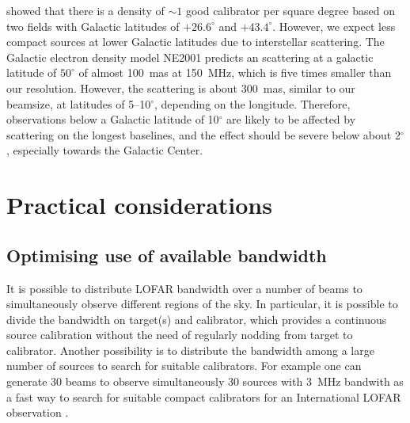 \documentclass[graybox]{svmult}
\begin{document}
\cite{moldon15} showed that there is a density of $\sim1$ good calibrator per
square degree based on two fields with Galactic latitudes of $+26.6^{\circ}$
and $+43.4^{\circ} $. However, we expect less compact sources at lower Galactic
latitudes due to interstellar scattering. The Galactic electron density model
NE2001 \citep{cordes02} predicts an scattering at a galactic latitude of
$50^{\circ}$ of almost 100~mas at 150~MHz, which is five times smaller than our
resolution. However, the scattering is about 300~mas, similar to our beamsize,
at latitudes of 5--10$^{\circ}$, depending on the longitude. Therefore,
observations below a Galactic latitude of 10$^{\circ}$ are likely to be
affected by scattering on the longest baselines, and the effect should be
severe below about 2$^{\circ}$, especially towards the Galactic Center. 


\section{Practical considerations}
\label{sec:practical}


\subsection{Optimising use of available bandwidth}\label{sec:bandwidth}
It is possible to distribute LOFAR bandwidth over a number of beams to
simultaneously observe different regions of the sky. In particular, it is
possible to divide the bandwidth on target(s) and calibrator, which provides a
continuous source calibration without the need of regularly nodding from target
to calibrator. Another possibility is to distribute the bandwidth among a large
number of sources to search for suitable calibrators. For example one can
generate 30 beams to observe simultaneously 30 sources with 3~MHz bandwith as a
fast way to search for suitable compact calibrators for an
International LOFAR observation \citep[see i.e.][]{moldon15}. 
\end{document}
